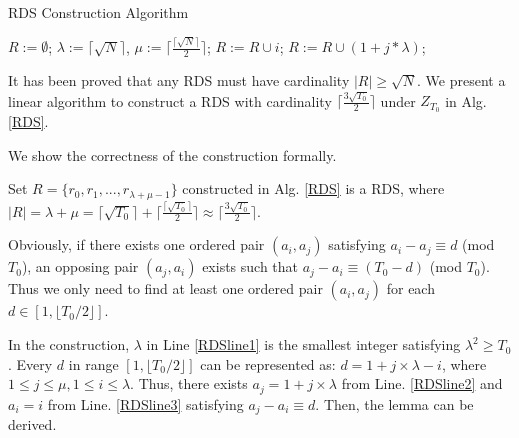 \begin{algorithm}[!h]
    \caption{RDS Construction Algorithm}
    \label{RDS}
    \begin{algorithmic}[1]
    \STATE $R :=\emptyset$; $\lambda :=\lceil \sqrt{N}  \rceil$,
    $\mu :=\lceil \frac{\lceil \sqrt{N} \rceil}{2} \rceil$;\label{RDSline1}
        \STATE $R :=R \cup i$; \label{RDSline2}
    \ENDFOR
        \STATE $R :=R \cup (1 + j * \lambda )$; \label{RDSline3}
    \ENDFOR
    \end{algorithmic}
\end{algorithm}

It has been proved that any RDS must have cardinality $|R| \geq \sqrt{N}$\cite{luk1997two}.
We present a linear algorithm to construct a RDS with 
cardinality $\lceil \frac{3\sqrt{T_0}}{2}  \rceil$ under $Z_{T_0}$ in Alg. \ref{RDS}.

We show the correctness of the construction formally.
\begin{lemma}
\label{RDS1}
Set $R = \{r_0, r_1, ..., r_{\lambda + \mu - 1}\}$ constructed in Alg. \ref{RDS} is a RDS,
where $|R| = \lambda + \mu = \lceil \sqrt{T_0}  \rceil + \lceil \frac{\lceil \sqrt{T_0} \rceil}{2} \rceil
\approx \lceil \frac{3\sqrt{T_0}}{2}  \rceil$.
\end{lemma}
\begin{IEEEproof}
Obviously, if there exists one ordered pair $(a_i,a_j)$ satisfying  $a_i - a_j \equiv d$ (mod $T_0$),
an opposing pair $(a_j,a_i)$ exists such that
$a_j - a_i \equiv (T_0-d)$ (mod $T_0$). Thus we only need to find
at least one ordered pair $(a_i,a_j)$ for each $d \in [1, \lfloor T_0/2 \rfloor]$.

In the construction, $\lambda$ in Line \ref{RDSline1} is the smallest integer satisfying
$\lambda^2 \geq T_0$. Every $d$ in range $[1, \lfloor T_0/2 \rfloor]$
can be represented as: $ d = 1 + j \times \lambda - i$, where $1 \leq j \leq \mu,
1 \leq i \leq \lambda$. Thus, there exists $a_j = 1 + j \times \lambda$
from Line. \ref{RDSline2} and $a_i = i$ from Line. \ref{RDSline3}
satisfying  $a_j - a_i \equiv d$. Then, the lemma can be derived.
\end{IEEEproof}

